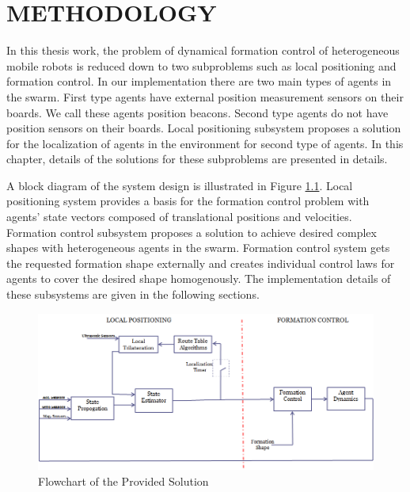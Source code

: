 

\chapter{METHODOLOGY}
\label{chp:Methodology}








In this thesis work, the problem of dynamical formation control of heterogeneous mobile robots is reduced down to two subproblems such as local positioning and formation control.  In our implementation there are two main types of agents in the swarm. First type agents have external position measurement sensors on their boards. We call these agents position beacons. Second type agents do not have position sensors on their boards. Local positioning subsystem proposes a solution for the localization of agents in the environment for second type of agents.   In this chapter, details of the solutions for these subproblems are presented in details.

A block diagram of the system design is illustrated in Figure \ref{general_system}. Local positioning system provides a basis for the formation control problem with agents' state vectors composed of translational positions and velocities. Formation control subsystem proposes a solution to achieve desired complex shapes with heterogeneous agents in the swarm. Formation control system gets the requested formation shape externally and creates individual control laws for agents to cover the desired shape homogenously. The implementation details of these subsystems are given in the following sections. 
\begin{figure}[H]
\caption{Flowchart of the Provided Solution} \label{general_system}
\centering
\includegraphics[scale = 0.58]{general_scheme}
\end{figure}

